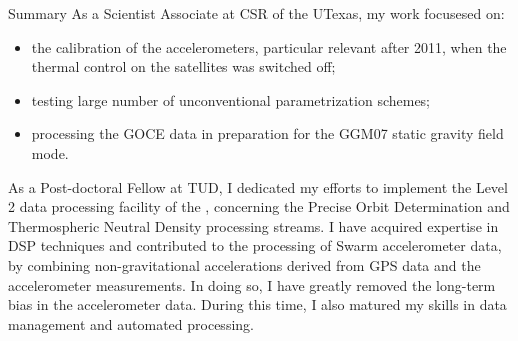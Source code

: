 \begin{cvtext}{Summary}
As a Scientist Associate at \ac{CSR} of the \ac{UTexas}, my work focusesed on:
\begin{itemize}[topsep=0pt,itemsep=1pt,parsep=0pt,partopsep=0pt]
\item the calibration of the accelerometers, particular relevant after 2011, when the thermal control on the satellites was switched off;
\item testing large number of unconventional parametrization schemes;
\item processing the \ac{GOCE} data in preparation for the GGM07 static gravity field mode.
\end{itemize}

As a Post-doctoral Fellow at \ac{TUD}, I dedicated my efforts to implement the Level 2 data processing facility of the , concerning the Precise Orbit Determination and Thermospheric Neutral Density processing streams.
I have acquired expertise in \ac{DSP} techniques and contributed to the processing of Swarm accelerometer data, by combining non-gravitational accelerations derived from \ac{GPS} data and the accelerometer measurements.
In doing so, I have greatly removed the long-term bias in the accelerometer data.
During this time, I also matured my skills in data management and automated processing.


\end{cvtext}
